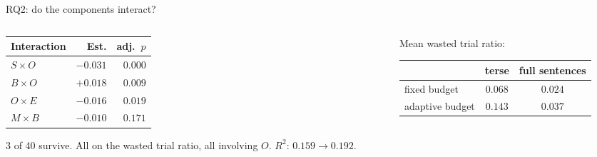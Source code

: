 \documentclass[aspectratio=169,11pt]{beamer}
\begin{document}
\begin{frame}{RQ2: do the components interact?}
\begin{columns}[T]
\begin{column}{0.46\textwidth}
\footnotesize
\begin{tabular}{@{}lrr@{}}
\toprule
Interaction & Est. & adj.\ $p$\\
\midrule
$S \times O$ & $-0.031$ & $0.000$\\
$B \times O$ & $+0.018$ & $0.009$\\
$O \times E$ & $-0.016$ & $0.019$\\
$M \times B$ & $-0.010$ & $0.171$\\
\bottomrule
\end{tabular}
\vspace{4pt}

\footnotesize 3 of 40 survive. All on the wasted trial ratio, all involving $O$.
$R^2$: $0.159 \to 0.192$.
\end{column}
\begin{column}{0.50\textwidth}
\footnotesize
Mean wasted trial ratio:
\vspace{2pt}

\begin{tabular}{@{}lcc@{}}
\toprule
 & terse & full sentences\\
\midrule
fixed budget    & $0.068$ & $0.024$\\
adaptive budget & $0.143$ & $0.037$\\
\bottomrule
\end{tabular}
\vspace{4pt}


\end{column}
\end{columns}
\end{frame}
\end{document}
